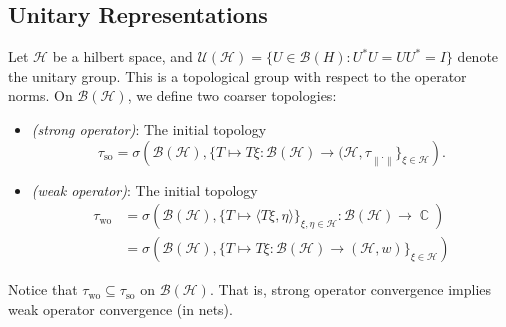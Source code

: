 \documentclass[11pt, a4paper]{memoir}
\DeclareMathOperator{\C}{{\mathbb{C}}}
\newcommand{\norm}[1]{\ensuremath{\left\lVert#1\right\rVert}}
\theoremstyle{change}
\theoremstyle{plain}
\theoremstyle{nonumberplain}
\newcommand{\defname}[1]{{\textit{(#1)}:}}
\numberwithin{equation}{section}
\begin{document}
\subsection{Unitary Representations}
Let $\mathcal{H}$ be a hilbert space, and $\mathcal{U}(\mathcal{H})=\{U\in\mathcal{B}(H):U^*U=UU^*=I\}$ denote the unitary group.
This is a topological group with respect to the operator norms.
On $\mathcal{B}(\mathcal{H})$, we define two coarser topologies:
\begin{itemize}[nl]
    \item \defname{strong operator}
        The initial topology
        \begin{equation*}
            \tau_{\mathrm{so}}=\sigma\left(\mathcal{B}(\mathcal{H}),\{T\mapsto T\xi:\mathcal{B}(\mathcal{H})\to (\mathcal{H},\tau_{\norm{\cdot}}\}_{\xi\in\mathcal{H}}\right).
        \end{equation*}
    \item \defname{weak operator}
        The initial topology
        \begin{align*}
            \tau_{\mathrm{wo}} &= \sigma\left(\mathcal{B}(\mathcal{H}),\{T\mapsto\langle T\xi,\eta\rangle\}_{\xi,\eta\in\mathcal{H}}:\mathcal{B}(\mathcal{H})\to\C\right)\\
                               &= \sigma\left(\mathcal{B}(\mathcal{H}),\{T\mapsto T\xi:\mathcal{B}(\mathcal{H})\to(\mathcal{H},w)\}_{\xi\in\mathcal{H}}\right)
        \end{align*}
\end{itemize}
Notice that $\tau_{\mathrm{wo}}\subseteq\tau_{\mathrm{so}}$ on $\mathcal{B}(\mathcal{H})$.
That is, strong operator convergence implies weak operator convergence (in nets).
\end{document}
